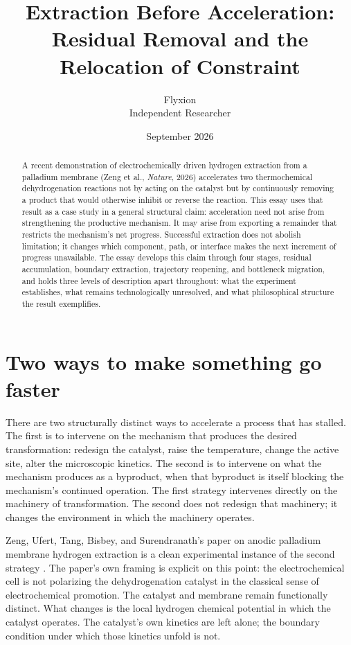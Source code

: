 \documentclass[11pt]{article}
\title{Extraction Before Acceleration: \\ Residual Removal and the Relocation of Constraint}
\author{Flyxion \\ \small Independent Researcher}
\date{September 2026}
\begin{document}
\maketitle

\begin{abstract}
A recent demonstration of electrochemically driven hydrogen extraction from a palladium membrane (Zeng et al., \emph{Nature}, 2026) accelerates two thermochemical dehydrogenation reactions not by acting on the catalyst but by continuously removing a product that would otherwise inhibit or reverse the reaction. This essay uses that result as a case study in a general structural claim: acceleration need not arise from strengthening the productive mechanism. It may arise from exporting a remainder that restricts the mechanism's net progress. Successful extraction does not abolish limitation; it changes which component, path, or interface makes the next increment of progress unavailable. The essay develops this claim through four stages, residual accumulation, boundary extraction, trajectory reopening, and bottleneck migration, and holds three levels of description apart throughout: what the experiment establishes, what remains technologically unresolved, and what philosophical structure the result exemplifies.
\end{abstract}

\section{Two ways to make something go faster}

There are two structurally distinct ways to accelerate a process that has stalled. The first is to intervene on the mechanism that produces the desired transformation: redesign the catalyst, raise the temperature, change the active site, alter the microscopic kinetics. The second is to intervene on what the mechanism produces as a byproduct, when that byproduct is itself blocking the mechanism's continued operation. The first strategy intervenes directly on the machinery of transformation. The second does not redesign that machinery; it changes the environment in which the machinery operates.

Zeng, Ufert, Tang, Bisbey, and Surendranath's paper on anodic palladium membrane hydrogen extraction is a clean experimental instance of the second strategy \cite{zeng2026}. The paper's own framing is explicit on this point: the electrochemical cell is not polarizing the dehydrogenation catalyst in the classical sense of electrochemical promotion. The catalyst and membrane remain functionally distinct. What changes is the local hydrogen chemical potential in which the catalyst operates. The catalyst's own kinetics are left alone; the boundary condition under which those kinetics unfold is not.
\end{document}
